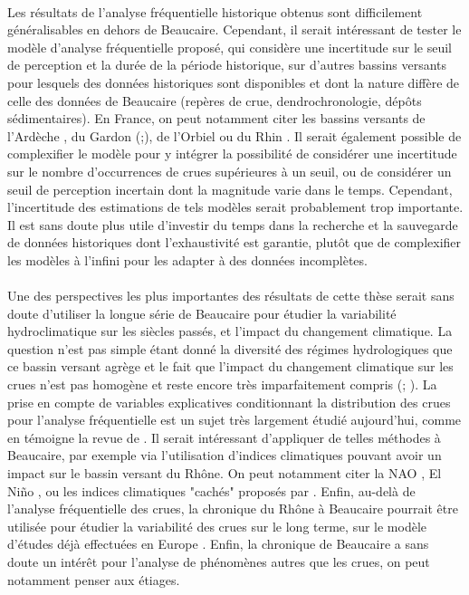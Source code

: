	\paragraph{} Les résultats de l'analyse fréquentielle historique obtenus sont difficilement généralisables en dehors de Beaucaire. Cependant, il serait intéressant de tester le modèle d'analyse fréquentielle proposé, qui considère une incertitude sur le seuil de perception et la durée de la période historique, sur d'autres bassins versants pour lesquels des données historiques sont disponibles et dont la nature diffère de celle des données de Beaucaire (repères de crue, dendrochronologie, dépôts sédimentaires). En France, on peut notamment citer les bassins versants de l'Ardèche \citep{naulet_flood_2005} , du Gardon (\cite{neppel_flood_2010};\cite{dezileau_multidating_2014}), de l'Orbiel \citep{payrastre_usefulness_2011} ou du Rhin \citep{lang_evaluation_2022}. Il serait également possible de complexifier le modèle pour y intégrer la possibilité de considérer une incertitude sur le nombre d'occurrences de crues supérieures à un seuil, ou de considérer un seuil de perception incertain dont la magnitude varie dans le temps. Cependant, l'incertitude des estimations de tels modèles serait probablement trop importante. Il est sans doute plus utile d'investir du temps dans la recherche et la sauvegarde de données historiques dont l'exhaustivité est garantie, plutôt que de complexifier les modèles à l'infini pour les adapter à des données incomplètes. 
			
	\paragraph{} Une des perspectives les plus importantes des résultats de cette thèse serait sans doute d'utiliser la longue série de Beaucaire pour étudier la variabilité hydroclimatique sur les siècles passés, et l'impact du changement climatique. La question n'est pas simple étant donné la diversité des régimes hydrologiques que ce bassin versant agrège et le fait que l'impact du changement climatique sur les crues n'est pas homogène et reste encore très imparfaitement compris (\cite{leblois_evaluation_2002}; \cite{giuntoli_floods_2019}). La prise en compte de variables explicatives conditionnant la distribution des crues pour l'analyse fréquentielle est un sujet très largement étudié aujourd'hui, comme en témoigne la revue de \citet{salas_techniques_2018}. Il serait intéressant d'appliquer de telles méthodes à Beaucaire, par exemple via l'utilisation d'indices climatiques pouvant avoir un impact sur le bassin versant du Rhône. On peut notamment citer la NAO \citep{criado-aldeanueva_climatic_2020}, El Niño \citep{bronnimann_impact_2007}, ou les indices climatiques "cachés" proposés par \citet{renard_hidden_2021}. Enfin, au-delà de l'analyse fréquentielle des crues, la chronique du Rhône à Beaucaire pourrait être utilisée pour étudier la variabilité des crues sur le long terme, sur le modèle d'études déjà effectuées en Europe \citep{bloschl_current_2020}. Enfin, la chronique de Beaucaire a sans doute un intérêt pour l'analyse de phénomènes autres que les crues, on peut notamment penser aux étiages.
	
